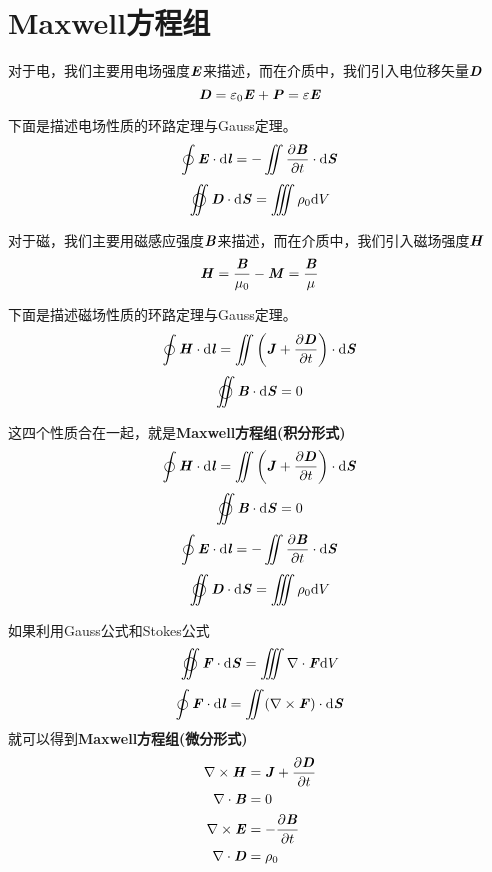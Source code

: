 \documentclass[UTF8,openany]{book}
\begin{document}
	\section{Maxwell方程组}
	\par 对于电，我们主要用电场强度$\textbf{\textit{E}}$来描述，而在介质中，我们引入电位移矢量$\textbf{\textit{D}}$
	\[
	\textbf{\textit{D}}=\varepsilon_0\textbf{\textit{E}}+\textbf{\textit{P}}
	=\varepsilon\textbf{\textit{E}}	
	\]
	\par 下面是描述电场性质的环路定理与Gauss定理。
	\[
	\oint\textbf{\textit{E}}\cdot\mathrm{d}\textbf{\textit{l}}
	=-\iint\frac{\partial\textbf{\textit{B}}}{\partial t}\cdot\mathrm{d}\textbf{\textit{S}}
	\]
	\[
	\varoiint\textbf{\textit{D}}\cdot\mathrm{d}\textbf{\textit{S}}=
	\iiint\rho_0\mathrm{d}V	
	\]
	\par 对于磁，我们主要用磁感应强度$\textbf{\textit{B}}$来描述，而在介质中，我们引入磁场强度$\textbf{\textit{H}}$
	\[
	\textbf{\textit{H}}=\frac{\textbf{\textit{B}}}{\mu_0}-\textbf{\textit{M}}=\frac{\textbf{\textit{B}}}{\mu}	
	\]
	\par 下面是描述磁场性质的环路定理与Gauss定理。
	\[
	\oint\textbf{\textit{H}}\cdot\mathrm{d}\textbf{\textit{l}}=
	\iint\left(\textbf{\textit{J}}+\frac{\partial\textbf{\textit{D}}}{\partial t}\right)\cdot\mathrm{d}\textbf{\textit{S}}
	\]
	\[
	\varoiint\textbf{\textit{B}}\cdot\mathrm{d}\textbf{\textit{S}}=0
	\]
	\par 这四个性质合在一起，就是\textbf{Maxwell方程组(积分形式)}
	$$\oint\textbf{\textit{H}}\cdot\mathrm{d}\textbf{\textit{l}}=
	\iint\left(\textbf{\textit{J}}+\frac{\partial\textbf{\textit{D}}}{\partial t}\right)
	\cdot\mathrm{d}\textbf{\textit{S}}$$
	$$\varoiint\textbf{\textit{B}}\cdot\mathrm{d}\textbf{\textit{S}}=0$$
	$$\oint\textbf{\textit{E}}\cdot\mathrm{d}\textbf{\textit{l}}
	=-\iint\frac{\partial\textbf{\textit{B}}}{\partial t}\cdot\mathrm{d}\textbf{\textit{S}}$$
	$$\varoiint\textbf{\textit{D}}\cdot\mathrm{d}\textbf{\textit{S}}=
	\iiint\rho_0\mathrm{d}V$$
	\par 如果利用Gauss公式和Stokes公式
	$$\varoiint\textbf{\textit{F}}\cdot\mathrm{d}\textbf{\textit{S}}=
	\iiint\nabla\cdot\textbf{\textit{F}}\mathrm{d}V$$
	\[
	\oint\textbf{\textit{F}}\cdot\mathrm{d}\textbf{\textit{l}}=
	\iint(\nabla\times\textbf{\textit{F}})\cdot\mathrm{d}\textbf{\textit{S}}	
	\]
	就可以得到\textbf{Maxwell方程组(微分形式)}
	\begin{align*}
	\nabla\times\textbf{\textit{H}}&=
	\textbf{\textit{J}}+\frac{\partial\textbf{\textit{D}}}{\partial t}\\
	\nabla\cdot\textbf{\textit{B}}&=0\\	
	\nabla\times\textbf{\textit{E}}&=-\frac{\partial\textbf{\textit{B}}}{\partial t}\\
	\nabla\cdot\textbf{\textit{D}}&=\rho_0\\
	\end{align*}
\end{document}
